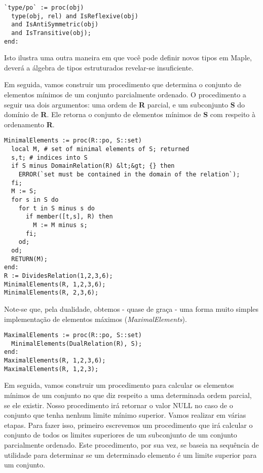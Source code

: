 \documentclass[a4paper]{article}
\begin{document}
\begin{lstlisting}
`type/po` := proc(obj)
  type(obj, rel) and IsReflexive(obj)
  and IsAntiSymmetric(obj)
  and IsTransitive(obj);
end:
\end{lstlisting}

Isto ilustra uma outra maneira em que você pode definir novos tipos em Maple, deverá a álgebra de tipos estruturados revelar-se insuficiente.

Em seguida, vamos construir um procedimento que determina o conjunto de elementos mínimos de um conjunto parcialmente ordenado. O procedimento a seguir usa dois argumentos: uma ordem de \textbf{R} parcial, e um subconjunto \textbf{S} do domínio de \textbf{R}. Ele retorna o conjunto de elementos mínimos de \textbf{S} com respeito à ordenamento \textbf{R}.

\begin{lstlisting}
MinimalElements := proc(R::po, S::set)
  local M, # set of minimal elements of S; returned
  s,t; # indices into S
  if S minus DomainRelation(R) &lt;&gt; {} then
    ERROR(`set must be contained in the domain of the relation`);
  fi;
  M := S;
  for s in S do
    for t in S minus s do
      if member([t,s], R) then
        M := M minus s;
      fi;
    od;
  od;
  RETURN(M);
end:
R := DividesRelation(1,2,3,6);
MinimalElements(R, 1,2,3,6);
MinimalElements(R, 2,3,6);
\end{lstlisting}

Note-se que, pela dualidade, obtemos - quase de graça - uma forma muito simples implementação de elementos máximos (\textit{MaximalElements}).

\begin{lstlisting}
MaximalElements := proc(R::po, S::set)
  MinimalElements(DualRelation(R), S);
end:
MaximalElements(R, 1,2,3,6);
MaximalElements(R, 1,2,3);
\end{lstlisting}

Em seguida, vamos construir um procedimento para calcular os elementos mínimos de um conjunto no que diz respeito a uma determinada ordem parcial, se ele existir. Nosso procedimento irá retornar o valor NULL no caso de o conjunto que tenha nenhum limite mínimo superior. Vamos realizar em várias etapas. Para fazer isso, primeiro escrevemos um procedimento que irá calcular o conjunto de todos os limites superiores de um subconjunto de um conjunto parcialmente ordenado. Este procedimento, por sua vez, se baseia na sequência de utilidade para determinar se um determinado elemento é um limite superior para um conjunto.
\end{document}
